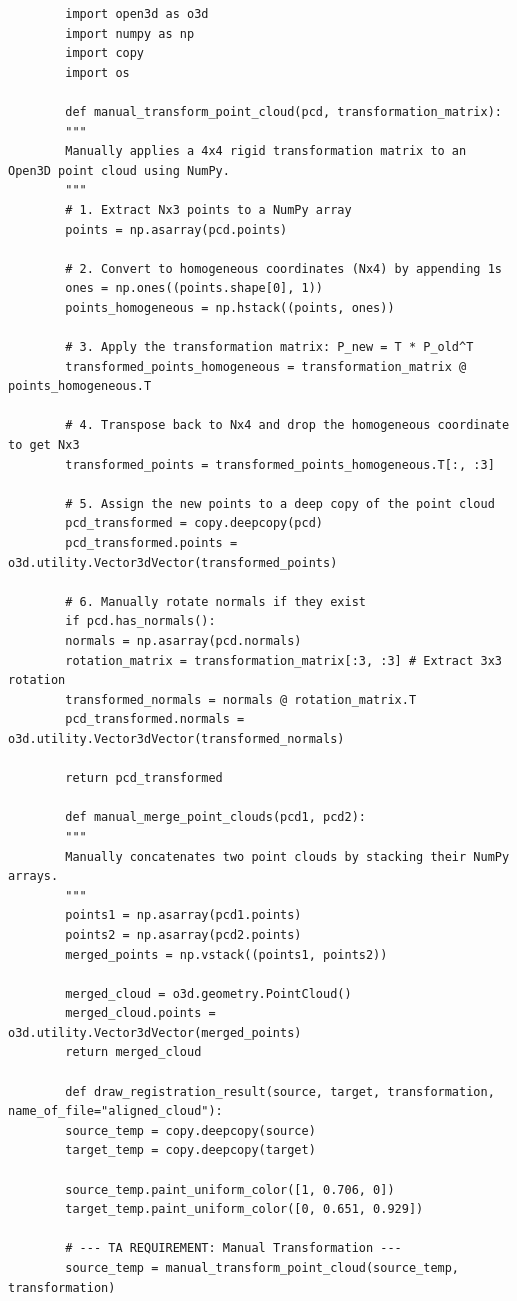 \documentclass[12pt,a4paper]{article}
\begin{document}
\begin{latin}
	\begin{verbatim}
		import open3d as o3d
		import numpy as np
		import copy
		import os
		
		def manual_transform_point_cloud(pcd, transformation_matrix):
		"""
		Manually applies a 4x4 rigid transformation matrix to an Open3D point cloud using NumPy.
		"""
		# 1. Extract Nx3 points to a NumPy array
		points = np.asarray(pcd.points)
		
		# 2. Convert to homogeneous coordinates (Nx4) by appending 1s
		ones = np.ones((points.shape[0], 1))
		points_homogeneous = np.hstack((points, ones))
		
		# 3. Apply the transformation matrix: P_new = T * P_old^T
		transformed_points_homogeneous = transformation_matrix @ points_homogeneous.T
		
		# 4. Transpose back to Nx4 and drop the homogeneous coordinate to get Nx3
		transformed_points = transformed_points_homogeneous.T[:, :3]
		
		# 5. Assign the new points to a deep copy of the point cloud
		pcd_transformed = copy.deepcopy(pcd)
		pcd_transformed.points = o3d.utility.Vector3dVector(transformed_points)
		
		# 6. Manually rotate normals if they exist
		if pcd.has_normals():
		normals = np.asarray(pcd.normals)
		rotation_matrix = transformation_matrix[:3, :3] # Extract 3x3 rotation
		transformed_normals = normals @ rotation_matrix.T
		pcd_transformed.normals = o3d.utility.Vector3dVector(transformed_normals)
		
		return pcd_transformed
		
		def manual_merge_point_clouds(pcd1, pcd2):
		"""
		Manually concatenates two point clouds by stacking their NumPy arrays.
		"""
		points1 = np.asarray(pcd1.points)
		points2 = np.asarray(pcd2.points)
		merged_points = np.vstack((points1, points2))
		
		merged_cloud = o3d.geometry.PointCloud()
		merged_cloud.points = o3d.utility.Vector3dVector(merged_points)
		return merged_cloud
		
		def draw_registration_result(source, target, transformation, name_of_file="aligned_cloud"):
		source_temp = copy.deepcopy(source)
		target_temp = copy.deepcopy(target)
		
		source_temp.paint_uniform_color([1, 0.706, 0])
		target_temp.paint_uniform_color([0, 0.651, 0.929])
		
		# --- TA REQUIREMENT: Manual Transformation ---
		source_temp = manual_transform_point_cloud(source_temp, transformation)
		

\end{verbatim}
\end{latin}
\end{document}
